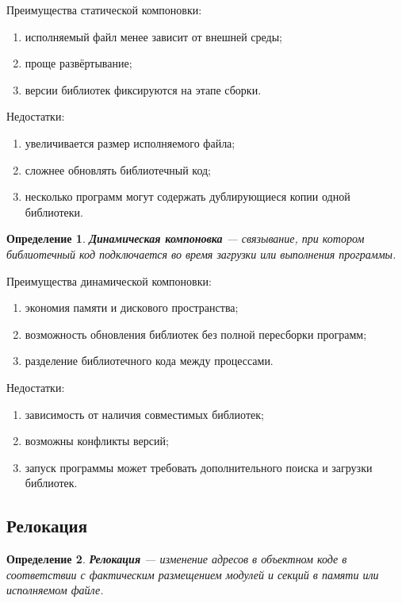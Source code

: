 \documentclass[12pt,a4paper]{article}
\newtheorem{definition}{Определение}
\begin{document}
Преимущества статической компоновки:
\begin{enumerate}
  \item исполняемый файл менее зависит от внешней среды;
  \item проще развёртывание;
  \item версии библиотек фиксируются на этапе сборки.
\end{enumerate}

Недостатки:
\begin{enumerate}
  \item увеличивается размер исполняемого файла;
  \item сложнее обновлять библиотечный код;
  \item несколько программ могут содержать дублирующиеся копии одной библиотеки.
\end{enumerate}

\begin{definition}
\textbf{Динамическая компоновка} --- связывание, при котором библиотечный код подключается во время загрузки или выполнения программы.
\end{definition}

Преимущества динамической компоновки:
\begin{enumerate}
  \item экономия памяти и дискового пространства;
  \item возможность обновления библиотек без полной пересборки программ;
  \item разделение библиотечного кода между процессами.
\end{enumerate}

Недостатки:
\begin{enumerate}
  \item зависимость от наличия совместимых библиотек;
  \item возможны конфликты версий;
  \item запуск программы может требовать дополнительного поиска и загрузки библиотек.
\end{enumerate}

\subsection{Релокация}

\begin{definition}
\textbf{Релокация} --- изменение адресов в объектном коде в соответствии с фактическим размещением модулей и секций в памяти или исполняемом файле.
\end{definition}
\end{document}
